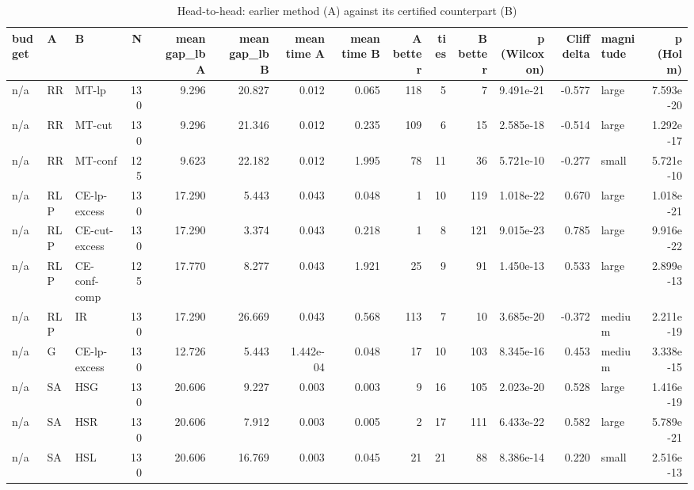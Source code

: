 \begin{table}[htbp]
\centering
\small
\caption{Head-to-head: earlier method (A) against its certified counterpart (B)}
\label{tab:E2_head_to_head_pairs}
\begin{tabular}{lllrrrrrrrrrrlr}
\toprule
budget & A & B & N & mean gap\_lb A & mean gap\_lb B & mean time A & mean time B & A better & ties & B better & p (Wilcoxon) & Cliff delta & magnitude & p (Holm) \\
\midrule
n/a & RR & MT-lp & 130 & 9.296 & 20.827 & 0.012 & 0.065 & 118 & 5 & 7 & 9.491e-21 & -0.577 & large & 7.593e-20 \\
n/a & RR & MT-cut & 130 & 9.296 & 21.346 & 0.012 & 0.235 & 109 & 6 & 15 & 2.585e-18 & -0.514 & large & 1.292e-17 \\
n/a & RR & MT-conf & 125 & 9.623 & 22.182 & 0.012 & 1.995 & 78 & 11 & 36 & 5.721e-10 & -0.277 & small & 5.721e-10 \\
n/a & RLP & CE-lp-excess & 130 & 17.290 & 5.443 & 0.043 & 0.048 & 1 & 10 & 119 & 1.018e-22 & 0.670 & large & 1.018e-21 \\
n/a & RLP & CE-cut-excess & 130 & 17.290 & 3.374 & 0.043 & 0.218 & 1 & 8 & 121 & 9.015e-23 & 0.785 & large & 9.916e-22 \\
n/a & RLP & CE-conf-comp & 125 & 17.770 & 8.277 & 0.043 & 1.921 & 25 & 9 & 91 & 1.450e-13 & 0.533 & large & 2.899e-13 \\
n/a & RLP & IR & 130 & 17.290 & 26.669 & 0.043 & 0.568 & 113 & 7 & 10 & 3.685e-20 & -0.372 & medium & 2.211e-19 \\
n/a & G & CE-lp-excess & 130 & 12.726 & 5.443 & 1.442e-04 & 0.048 & 17 & 10 & 103 & 8.345e-16 & 0.453 & medium & 3.338e-15 \\
n/a & SA & HSG & 130 & 20.606 & 9.227 & 0.003 & 0.003 & 9 & 16 & 105 & 2.023e-20 & 0.528 & large & 1.416e-19 \\
n/a & SA & HSR & 130 & 20.606 & 7.912 & 0.003 & 0.005 & 2 & 17 & 111 & 6.433e-22 & 0.582 & large & 5.789e-21 \\
n/a & SA & HSL & 130 & 20.606 & 16.769 & 0.003 & 0.045 & 21 & 21 & 88 & 8.386e-14 & 0.220 & small & 2.516e-13 \\
\bottomrule
\end{tabular}
\end{table}
